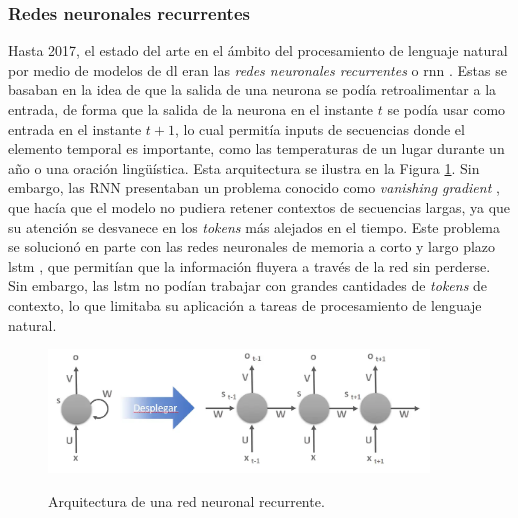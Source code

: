 \subsubsection{Redes neuronales recurrentes}
Hasta 2017, el estado del arte en el ámbito del procesamiento de lenguaje natural por medio de modelos de \gls{dl} eran las \emph{redes neuronales recurrentes} o \gls{rnn} \citep{schmidtRecurrentNeuralNetworks2019}. Estas se basaban en la idea de que la salida de una neurona se podía retroalimentar a la entrada, de forma que la salida de la neurona en el instante $t$ se podía usar como entrada en el instante $t+1$, lo cual permitía inputs de secuencias donde el elemento temporal es importante, como las temperaturas de un lugar durante un año o una oración lingüística. Esta arquitectura se ilustra en la Figura \ref{fig:red_neuronal_recurrente}. Sin embargo, las RNN presentaban un problema conocido como \emph{vanishing gradient} \citep{pascanuDifficultyTrainingRecurrent2013}, que hacía que el modelo no pudiera retener contextos de secuencias largas, ya que su atención se desvanece en los \emph{tokens} más alejados en el tiempo. Este problema se solucionó en parte con las redes neuronales de memoria a corto y largo plazo \gls{lstm} \citep{HochreiterVanishingGradient1998}, que permitían que la información fluyera a través de la red sin perderse. Sin embargo, las \gls{lstm} no podían trabajar con grandes cantidades de \emph{tokens} de contexto, lo que limitaba su aplicación a tareas de procesamiento de lenguaje natural.

\begin{figure}[H]
    \caption[Arquitectura de una red neuronal recurrente]{Arquitectura de una red neuronal recurrente.}
    \centering
    \includegraphics[width=0.9\textwidth]{./figuras/red_neuronal_recurrente.png}
    \label{fig:red_neuronal_recurrente}
\end{figure}


